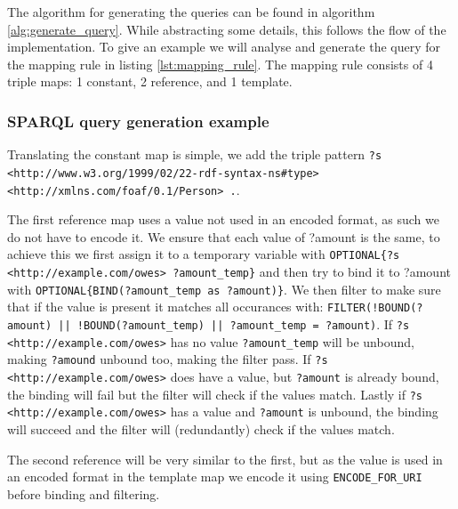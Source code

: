 
The algorithm for generating the queries can be found in algorithm \ref{alg:generate_query}. While abstracting some details, this follows the flow of the implementation. To give an example we will analyse and generate the query for the mapping rule in listing \ref{lst:mapping_rule}. The mapping rule consists of 4 triple maps: 1 constant, 2 reference, and 1 template. 
\subsubsection{SPARQL query generation example}

Translating the constant map is simple, we add the triple pattern \texttt{?s <http://www.w3.org/1999/02/22-rdf-syntax-ns\#type> <http://xmlns.com/foaf/0.1/Person> .}. 

The first reference map uses a value not used in an encoded format, as such we do not have to encode it. We ensure that each value of ?amount is the same, to achieve this we first assign it to a temporary variable with \texttt{OPTIONAL\{?s <http://example.com/owes> ?amount\_temp\}} and then try to bind it to ?amount with \texttt{OPTIONAL\{BIND(?amount\_temp as ?amount)\}}. We then filter to make sure that if the value is present it matches all occurances with: \texttt{FILTER(!BOUND(?amount) || !BOUND(?amount\_temp) || ?amount\_temp = ?amount)}. If \texttt{?s <http://example.com/owes>} has no value \texttt{?amount\_temp} will be unbound, making \texttt{?amound} unbound too, making the filter pass. If \texttt{?s <http://example.com/owes>} does have a value, but \texttt{?amount} is already bound, the binding will fail but the filter will check if the values match. Lastly if \texttt{?s <http://example.com/owes>} has a value and \texttt{?amount} is unbound, the binding will succeed and the filter will (redundantly) check if the values match. 

The second reference will be very similar to the first, but as the value is used in an encoded format in the template map we encode it using \texttt{ENCODE\_FOR\_URI} before binding and filtering.

